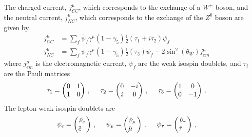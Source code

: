   The charged current, $j^{\mu}_{CC}$, which corresponds to the exchange of a
  $W^{\pm}$ boson, and the neutral current, $j^{\mu}_{NC}$, which corresponds
  to the exchange of the $Z^0$ boson are given by
  \begin{align}\label{eq:ccurrent}
      j^{\mu}_{CC} &= \sum_f \bar{\psi}_f \gamma^{\mu} (1-\gamma_5) \frac{1}{2}(\tau_1 + i\tau_2) \psi_f \\
        \label{eq:ncurrent}
      j^{\mu}_{NC} &= \sum_f \bar{\psi}_f \gamma^{\mu} (1-\gamma_5) \frac{1}{2}(\tau_3) \psi_f 
       - 2\sin^2(\theta_W) j^{\mu}_{em}
  \end{align}
  where $j^{\mu}_{em}$ is the electromagnetic current, $\psi_{f}$ are the weak
  isospin doublets, and $\tau_i$ are the Pauli matrices
  \begin{equation}
      \tau_1 = 
      \begin{pmatrix}
        0 & 1 \\
        1 & 0
      \end{pmatrix} \,,
      \hspace{5mm}
      \tau_2 = 
      \begin{pmatrix}
        0 & -i \\
        i & 0
      \end{pmatrix} \,,
      \hspace{5mm}
      \tau_3 = 
      \begin{pmatrix}
        1 & 0 \\
        0 & -1
      \end{pmatrix} \,.
  \end{equation}
  The lepton weak isospin doublets are
  \begin{equation}
    \psi_{e} = 
    \begin{pmatrix}
        \hat{\nu}_{e} \\
        \hat{e}^-
    \end{pmatrix} \,,
      \hspace{5mm}
    \psi_{\mu} = 
    \begin{pmatrix}
        \hat{\nu}_{\mu} \\
        \hat{\mu}^-
    \end{pmatrix} \,,
      \hspace{5mm}
    \psi_{\tau} = 
    \begin{pmatrix}
        \hat{\nu}_{\tau} \\
        \hat{\tau}^-
    \end{pmatrix} \,,
  \end{equation}
